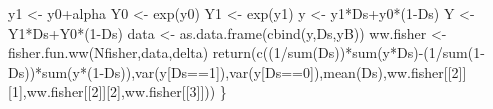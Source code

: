 \documentclass[
]{book}
\newenvironment{Shaded}{\begin{snugshade}}{\end{snugshade}}
\newcommand{\DecValTok}[1]{\textcolor[rgb]{0.00,0.00,0.81}{#1}}
\newcommand{\FunctionTok}[1]{\textcolor[rgb]{0.00,0.00,0.00}{#1}}
\newcommand{\NormalTok}[1]{#1}
\newcommand{\OtherTok}[1]{\textcolor[rgb]{0.56,0.35,0.01}{#1}}
\newcommand{\SpecialCharTok}[1]{\textcolor[rgb]{0.00,0.00,0.00}{#1}}
\theoremstyle{definition}
\theoremstyle{definition}
\theoremstyle{definition}
\theoremstyle{definition}
\theoremstyle{remark}
\begin{document}
\begin{Shaded}
\begin{Highlighting}[]
\NormalTok{  y1 }\OtherTok{\textless{}{-}}\NormalTok{ y0}\SpecialCharTok{+}\NormalTok{alpha}
\NormalTok{  Y0 }\OtherTok{\textless{}{-}} \FunctionTok{exp}\NormalTok{(y0)}
\NormalTok{  Y1 }\OtherTok{\textless{}{-}} \FunctionTok{exp}\NormalTok{(y1)}
\NormalTok{  y }\OtherTok{\textless{}{-}}\NormalTok{ y1}\SpecialCharTok{*}\NormalTok{Ds}\SpecialCharTok{+}\NormalTok{y0}\SpecialCharTok{*}\NormalTok{(}\DecValTok{1}\SpecialCharTok{{-}}\NormalTok{Ds)}
\NormalTok{  Y }\OtherTok{\textless{}{-}}\NormalTok{ Y1}\SpecialCharTok{*}\NormalTok{Ds}\SpecialCharTok{+}\NormalTok{Y0}\SpecialCharTok{*}\NormalTok{(}\DecValTok{1}\SpecialCharTok{{-}}\NormalTok{Ds)}
\NormalTok{  data }\OtherTok{\textless{}{-}} \FunctionTok{as.data.frame}\NormalTok{(}\FunctionTok{cbind}\NormalTok{(y,Ds,yB))}
\NormalTok{  ww.fisher }\OtherTok{\textless{}{-}} \FunctionTok{fisher.fun.ww}\NormalTok{(Nfisher,data,delta)}
  \FunctionTok{return}\NormalTok{(}\FunctionTok{c}\NormalTok{((}\DecValTok{1}\SpecialCharTok{/}\FunctionTok{sum}\NormalTok{(Ds))}\SpecialCharTok{*}\FunctionTok{sum}\NormalTok{(y}\SpecialCharTok{*}\NormalTok{Ds)}\SpecialCharTok{{-}}\NormalTok{(}\DecValTok{1}\SpecialCharTok{/}\FunctionTok{sum}\NormalTok{(}\DecValTok{1}\SpecialCharTok{{-}}\NormalTok{Ds))}\SpecialCharTok{*}\FunctionTok{sum}\NormalTok{(y}\SpecialCharTok{*}\NormalTok{(}\DecValTok{1}\SpecialCharTok{{-}}\NormalTok{Ds)),}\FunctionTok{var}\NormalTok{(y[Ds}\SpecialCharTok{==}\DecValTok{1}\NormalTok{]),}\FunctionTok{var}\NormalTok{(y[Ds}\SpecialCharTok{==}\DecValTok{0}\NormalTok{]),}\FunctionTok{mean}\NormalTok{(Ds),ww.fisher[[}\DecValTok{2}\NormalTok{]][}\DecValTok{1}\NormalTok{],ww.fisher[[}\DecValTok{2}\NormalTok{]][}\DecValTok{2}\NormalTok{],ww.fisher[[}\DecValTok{3}\NormalTok{]]))}
\NormalTok{\}}


\end{Highlighting}
\end{Shaded}
\end{document}
